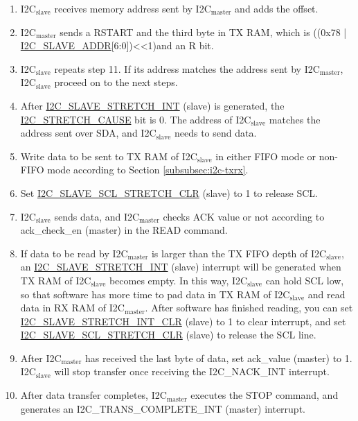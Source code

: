 \documentclass[main\_\_EN.tex]{subfiles}
\begin{document}
\begin{enumerate}
\item I2C$_\text{slave}$ receives memory address sent by I2C$_\text{master}$ and adds the offset.
\item I2C$_\text{master}$ sends a RSTART and the third byte in TX RAM, which is ((0x78 | \hyperref[fielddesc:I2CSLAVEADDR]{I2C\_SLAVE\_ADDR}[6:0])<<1)and an R bit.
\item I2C$_\text{slave}$ repeats step 11. If its address matches the address sent by I2C$_\text{master}$, I2C$_\text{slave}$ proceed on to the next steps.
\item After \hyperref[int:i2c-slave-stretch]{I2C\_SLAVE\_STRETCH\_INT} (slave) is generated, the \hyperref[fielddesc:I2CSTRETCHCAUSE]{I2C\_STRETCH\_CAUSE} bit is 0. The address of I2C$_\text{slave}$ matches the address sent over SDA, and I2C$_\text{slave}$ needs to send data.
\item Write data to be sent to TX RAM of I2C$_\text{slave}$ in either FIFO mode or non-FIFO mode according to Section \ref{subsubsec:i2c-txrx}.
\item Set \hyperref[fielddesc:I2CSLAVESCLSTRETCHCLR]{I2C\_SLAVE\_SCL\_STRETCH\_CLR} (slave) to 1 to release SCL.
\item I2C$_\text{slave}$ sends data, and I2C$_\text{master}$ checks ACK value or not according to ack\_check\_en (master) in the READ command.
\item If data to be read by I2C$_\text{master}$ is larger than the TX FIFO depth of I2C$_\text{slave}$, an \hyperref[int:i2c-slave-stretch]{I2C\_SLAVE\_STRETCH\_INT} (slave) interrupt will be generated when TX RAM of I2C$_\text{slave}$ becomes empty. In this way, I2C$_\text{slave}$ can hold SCL low, so that software has more time to pad data in TX RAM of I2C$_\text{slave}$ and read data in RX RAM of I2C$_\text{master}$. After software has finished reading, you can set \hyperref[fielddesc:I2CSLAVESTRETCHINTCLR]{I2C\_SLAVE\_STRETCH\_INT\_CLR} (slave) to 1 to clear interrupt, and set \hyperref[fielddesc:I2CSLAVESCLSTRETCHCLR]{I2C\_SLAVE\_SCL\_STRETCH\_CLR} (slave) to release the SCL line.
\item After I2C$_\text{master}$ has received the last byte of data, set ack\_value (master) to 1. I2C$_\text{slave}$ will stop transfer once receiving the I2C\_NACK\_INT interrupt.
\item After data transfer completes, I2C$_\text{master}$ executes the STOP command, and generates an I2C\_TRANS\_COMPLETE\_INT (master) interrupt.
\end{enumerate}
\end{document}
